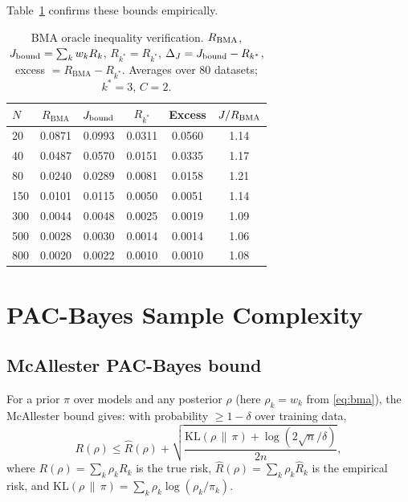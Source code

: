 \documentclass[ba]{imsart}
\theoremstyle{plain}
\theoremstyle{definition}
\theoremstyle{remark}
\newcommand{\kl}{\mathrm{KL}}
\newcommand{\Rbma}{R_{\mathrm{BMA}}}
\newcommand{\Rora}{R_{k^*}}
\begin{document}
Table~\ref{tab:bma_oracle} confirms these bounds empirically.

\begin{table}[t]
\centering
\caption{BMA oracle inequality verification.
  $R_{\rm BMA}$, $J_{\rm bound}=\sum_k w_k R_k$, $\Rora=R_{k^*}$,
  $\Delta_J = J_{\rm bound}-\Rora$, excess $=\Rbma-\Rora$.
  Averages over 80 datasets; $k^*=3$, $C=2$.}
\label{tab:bma_oracle}
\begin{tabular}{lccccc}
\toprule
$N$ & $\Rbma$ & $J_{\rm bound}$ & $\Rora$ & Excess & $J/R_{\rm BMA}$ \\
\midrule
 20 & 0.0871 & 0.0993 & 0.0311 & 0.0560 & 1.14 \\
 40 & 0.0487 & 0.0570 & 0.0151 & 0.0335 & 1.17 \\
 80 & 0.0240 & 0.0289 & 0.0081 & 0.0158 & 1.21 \\
150 & 0.0101 & 0.0115 & 0.0050 & 0.0051 & 1.14 \\
300 & 0.0044 & 0.0048 & 0.0025 & 0.0019 & 1.09 \\
500 & 0.0028 & 0.0030 & 0.0014 & 0.0014 & 1.06 \\
800 & 0.0020 & 0.0022 & 0.0010 & 0.0010 & 1.08 \\
\bottomrule
\end{tabular}
\end{table}

\section{PAC-Bayes Sample Complexity}
\label{sec:pacbayes}

\subsection{McAllester PAC-Bayes bound}

For a prior $\pi$ over models and any posterior $\rho$
(here $\rho_k = w_k$ from \eqref{eq:bma}), the McAllester bound
\citep{mcallester1999,mcallester2003} gives:
with probability $\geq 1-\delta$ over training data,
\begin{equation}
  R(\rho) \leq \hat{R}(\rho)
  + \sqrt{\frac{\kl(\rho\,\|\,\pi) + \log(2\sqrt{n}/\delta)}{2n}},
  \label{eq:pacbayes}
\end{equation}
where $R(\rho) = \sum_k \rho_k R_k$ is the true risk,
$\hat{R}(\rho) = \sum_k \rho_k \hat{R}_k$ is the empirical risk,
and $\kl(\rho\,\|\,\pi) = \sum_k \rho_k\log(\rho_k/\pi_k)$.
\end{document}

